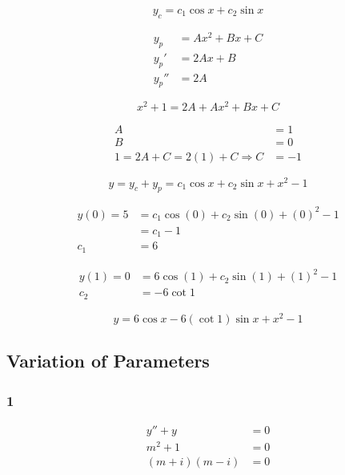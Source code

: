 \documentclass{article}
\begin{document}
\[y_c = c_1 \cos x + c_2 \sin x\]

\begin{align*}
  y_p   & = Ax^2 + Bx + C \\
  y_p'  & = 2Ax + B       \\
  y_p'' & = 2A
\end{align*}

\[x^2 + 1 = 2A + Ax^2 + Bx + C\]

\begin{align*}
  A                                    & = 1  \\
  B                                    & = 0  \\
  1 = 2A + C = 2 (1) + C \Rightarrow C & = -1
\end{align*}

\[y = y_c + y_p = c_1 \cos x + c_2 \sin x + x^2 - 1\]

\begin{align*}
  y(0) = 5 & = c_1 \cos (0) + c_2 \sin (0) + (0)^2 - 1 \\
           & = c_1 - 1                                 \\
  c_1      & = 6
\end{align*}

\begin{align*}
  y(1) = 0 & = 6 \cos (1) + c_2 \sin (1) + (1)^2 - 1 \\
  c_2      & = -6 \cot 1
\end{align*}

\[y = 6 \cos x - 6 (\cot 1) \sin x + x^2 - 1\]

\subsection{Variation of Parameters}

\subsubsection{1}

\begin{align*}
  y'' + y         & = 0 \\
  m^2 + 1         & = 0 \\
  (m + i) (m - i) & = 0
\end{align*}
\end{document}
